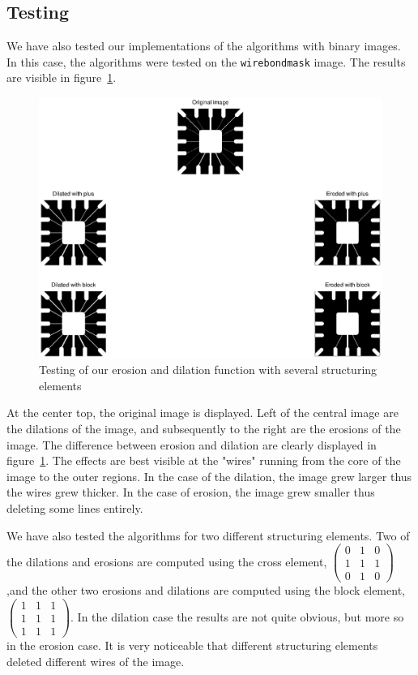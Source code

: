 \subsection{Testing}
We have also tested our implementations of the algorithms with binary images. In this case, the algorithms were tested on the \texttt{wirebondmask} image. The results are visible in figure~\ref{fig:erosiondilation}.
\begin{figure}[htb]
 \centering
 \includegraphics[width=\linewidth]{erosiondilation.eps}
 \caption{Testing of our erosion and dilation function with several structuring elements}
 \label{fig:erosiondilation}
\end{figure}

At the center top, the original image is displayed. Left of the central image are the dilations of the image, and subsequently to the right are the erosions of the image. The difference between erosion and dilation are clearly displayed in figure~\ref{fig:erosiondilation}. The effects are best visible at the "wires" running from the core of the image to the outer regions. In the case of the dilation, the image grew larger thus the wires grew thicker.
In the case of erosion, the image grew smaller thus deleting some lines entirely. 

We have also tested the algorithms for two different structuring elements. Two of the dilations and erosions are computed using the cross element, $\left(\begin{matrix}0 & 1 & 0 \\ 1 & 1 & 1 \\ 0 & 1 & 0 \end{matrix}\right)$,and the other two erosions and dilations are computed using the block element, $\left(\begin{matrix}1 & 1 & 1 \\ 1 & 1 & 1 \\ 1& 1 & 1 \end{matrix}\right)$. In the dilation case the results are not quite obvious, but more so in the erosion case. It is very noticeable that different structuring elements deleted different wires of the image. 

\clearpage